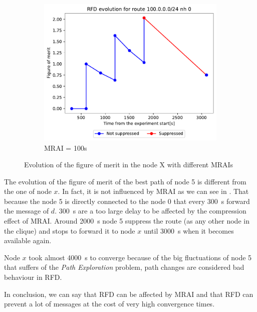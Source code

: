 \begin{figure}[h]
\begin{subfigure}[b]{0.3\textwidth}
     \end{subfigure}
     \hfill
     \begin{subfigure}[b]{0.3\textwidth}
         \centering
         \includegraphics[width=\textwidth]{images/RFD/clique/FigureOfMerit/mrai21_RFD_5_rfd_R1.pdf}
         \caption{MRAI = 100s}
         \label{fig:clique_5_mrai100}
     \end{subfigure}
        \caption{Evolution of the figure of merit in the node X with different MRAIs}
        \label{fig:clique_node5}
\end{figure}

The evolution of the figure of merit of the best path of node \num{5} is different
from the one of node $x$.
In fact, it is not influenced by \ac{MRAI} as we can see in .
That because the node \num{5} is directly connected to the node \num{0} that every
\SI{300}{\second} forward the message of $d$. \SI{300}{\second} are a too large
delay to be affected by the compression effect of \ac{MRAI}.
Around \SI{2000}{\second} node \num{5} suppress the route (as any other node in the
clique) and stops to forward it to node $x$ until \SI{3000}{\second} when it becomes
available again.

Node $x$ took almost \SI{4000}{\second} to converge because of the big fluctuations
of node \num{5} that suffers of the \textit{Path Exploration} problem, path
changes are considered bad behaviour in \ac{RFD}.

In conclusion, we can say that \ac{RFD} can be affected by \ac{MRAI} and
that \ac{RFD} can prevent a lot of messages at the cost of very high convergence
times.

